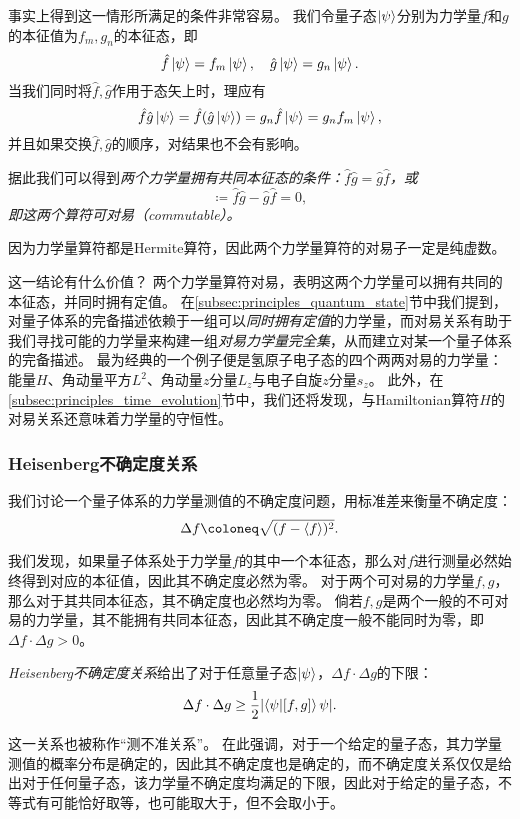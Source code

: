 事实上得到这一情形所满足的条件非常容易。
我们令量子态$\ket{\psi}$分别为力学量$f$和$g$的本征值为$f_m, g_n$的本征态，即
\begin{equation}
    \hat{f}\ket{\psi} = f_m\ket{\psi},\quad \hat{g}\ket{\psi} = g_n\ket{\psi}.
\end{equation}
当我们同时将$\hat{f},\hat{g}$作用于态矢上时，理应有
\begin{equation}
    \hat{f}\hat{g}\ket{\psi} = \hat{f}(\hat{g}\ket{\psi}) = g_n \hat{f}\ket{\psi} = g_n f_m \ket{\psi},
\end{equation}
并且如果交换$\hat{f},\hat{g}$的顺序，对结果也不会有影响。
\begin{tcolorbox}
据此我们可以得到\emph{两个力学量拥有共同本征态的条件：}$\hat{f}\hat{g}=\hat{g}\hat{f}$\emph{，或}
\begin{equation}
    [f,g] \coloneq \hat{f}\hat{g}-\hat{g}\hat{f} = 0,
\end{equation}
\emph{即这两个算符可对易（commutable）。}
\end{tcolorbox}
因为力学量算符都是Hermite算符，因此两个力学量算符的对易子一定是纯虚数。

这一结论有什么价值？
两个力学量算符对易，表明这两个力学量可以拥有共同的本征态，并同时拥有定值。
在\ref{subsec:principles_quantum_state}节中我们提到，对量子体系的完备描述依赖于一组可以\emph{同时拥有定值}的力学量，而对易关系有助于我们寻找可能的力学量来构建一组\emph{对易力学量完全集}，从而建立对某一个量子体系的完备描述。
最为经典的一个例子便是氢原子电子态的四个两两对易的力学量：能量$H$、角动量平方$L^2$、角动量$z$分量$L_z$与电子自旋$z$分量$s_z$。
此外，在\ref{subsec:principles_time_evolution}节中，我们还将发现，与Hamiltonian算符$H$的对易关系还意味着力学量的守恒性。

\subsubsection{Heisenberg不确定度关系}

我们讨论一个量子体系的力学量测值的不确定度问题，用标准差来衡量不确定度：
\begin{equation}
    \Delta f \coloneq \sqrt{(f-\expval{f})^2}.
\end{equation}

我们发现，如果量子体系处于力学量$f$的其中一个本征态，那么对$f$进行测量必然始终得到对应的本征值，因此其不确定度必然为零。
对于两个可对易的力学量$f,g$，那么对于其共同本征态，其不确定度也必然均为零。
倘若$f,g$是两个一般的不可对易的力学量，其不能拥有共同本征态，因此其不确定度一般不能同时为零，即$\Delta f \cdot \Delta g > 0$。
\begin{tcolorbox}
\emph{Heisenberg不确定度关系}给出了对于任意量子态$\ket{\psi}$，$\Delta f \cdot \Delta g$的下限：
\begin{equation}
    \label{eq:principle_uncertainty_relation}
    \Delta f \cdot \Delta g \geq \frac12 \abs{\braket{\psi}{[f,g]}{\psi}}.
\end{equation}
\end{tcolorbox}
这一关系也被称作“测不准关系”。
在此强调，对于一个给定的量子态，其力学量测值的概率分布是确定的，因此其不确定度也是确定的，而不确定度关系仅仅是给出对于任何量子态，该力学量不确定度均满足的下限，因此对于给定的量子态，不等式有可能恰好取等，也可能取大于，但不会取小于。

